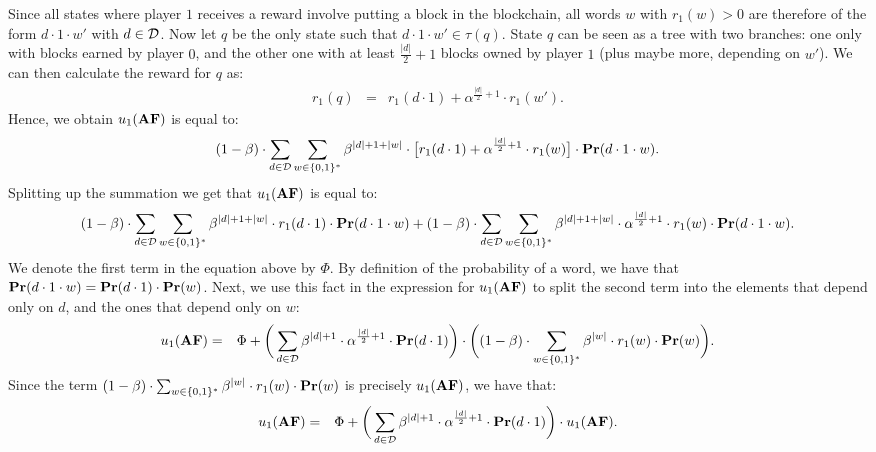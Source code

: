 Since all states where player $1$ receives a reward involve putting a block in the blockchain, all words 
$w$ with $r_1(w) > 0$ are therefore of the form $d\cdot 1\cdot w'$ with $d \in \mathcal{D}$. Now let $q$ be the only state such that  $d\cdot 1\cdot w' \in \tau(q)$.
State $q$ can be seen as a tree with two branches: one only with blocks earned by player $0$, and the other one 
with at least ${\frac{|d|}{2}+1}$ blocks owned by player $1$ (plus maybe more, depending on $w'$). 
We can then calculate the reward for $q$ as: 
\begin{eqnarray*}
r_1(q) & = & r_1(d \cdot 1) + \alpha^{\frac{|d|}{2}+1}\cdot r_1(w').
\end{eqnarray*}
Hence, we obtain $u_1(\text{\rm {\bf AF}})$ is equal to:
\begin{eqnarray*}
 (1-\beta)\cdot\sum_{d\in \mathcal{D}}  \sum_{w\in \{0,1\}^*}\beta^{|d|+1+|w|}\cdot \big[r_1(d\cdot 1) + \alpha^{\frac{|d|}{2}+1}\cdot r_1(w)\big] \cdot \mathbf{Pr}(d\cdot 1 \cdot w).
\end{eqnarray*}
%
Splitting up the summation we get that $ u_1(\text{\rm {\bf AF}})$ is equal to:
\begin{eqnarray*}
(1-\beta)\cdot \sum_{d\in \mathcal{D}}  \sum_{w\in \{0,1\}^*}\beta^{|d|+1+|w|}\cdot r_1(d\cdot 1) \cdot \mathbf{Pr}(d\cdot 1\cdot w) +
 (1-\beta)\cdot \sum_{d\in \mathcal{D}}  \sum_{w\in \{0,1\}^*}\beta^{|d|+1+|w|}\cdot  \alpha^{\frac{|d|}{2}+1}\cdot r_1(w) \cdot \mathbf{Pr}(d\cdot 1 \cdot w).
\end{eqnarray*}
%
We denote the first term in the equation above by $\Phi$. 
By definition of the probability of a word, we have that $\mathbf{Pr}(d\cdot 1\cdot w) = \mathbf{Pr}(d\cdot 1)\cdot \mathbf{Pr}(w)$. 
Next, we use this fact in the expression for $u_1(\text{\rm {\bf AF}})$ to split the second term into the elements that depend only on $d$, and the ones that depend only on $w$:
%
\begin{eqnarray*}
 u_1(\text{\rm {\bf AF}}) & = & \Phi  + 
  \bigg(\sum_{d\in \mathcal{D}} \beta^{|d|+1}\cdot  \alpha^{\frac{|d|}{2}+1}\cdot \mathbf{Pr}(d\cdot 1)\bigg) \cdot 
 \bigg((1-\beta)\cdot\sum_{w\in \{0,1\}^*} \beta^{|w|} \cdot r_1(w)  \cdot \mathbf{Pr}(w)\bigg).
\end{eqnarray*}
%
Since the term $(1-\beta)\cdot\sum_{w\in \{0,1\}^*} \beta^{|w|} \cdot r_1(w)  \cdot \mathbf{Pr}(w)$ is precisely $u_1(\text{\rm {\bf AF}})$, we have that:
%
\begin{eqnarray*}
 u_1(\text{\rm {\bf AF}}) & = & \Phi + 
 \bigg(\sum_{d\in \mathcal{D}} \beta^{|d|+1}\cdot  \alpha^{\frac{|d|}{2}+1}\cdot \mathbf{Pr}(d\cdot 1)\bigg) \cdot  u_1(\text{\rm {\bf AF}}).
\end{eqnarray*}
